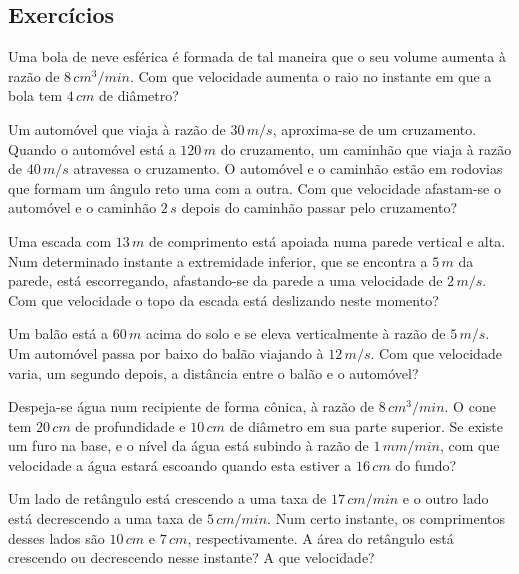 \cleardoublepage\documentclass[../main.tex]{subfiles}
\begin{document}
\subsection{Exercícios}
\begin{exer}
Uma bola de neve esférica é formada de tal maneira que o seu volume aumenta à razão de $8  \, cm^3/min$. Com que velocidade aumenta o raio no instante em que a bola tem $4   \, cm$ de diâmetro? 
\end{exer}
\begin{exer}
 Um automóvel que viaja à razão de $30   \, m/s$, aproxima-se de um cruzamento. Quando o automóvel está a $120\, m$ do cruzamento, um caminhão que viaja à razão de $40  \, m/s$ atravessa o cruzamento. O automóvel e o caminhão estão em rodovias que formam um ângulo reto uma com a outra. Com que velocidade afastam-se o automóvel e o caminhão $2\,s$ depois do caminhão passar pelo cruzamento? 
\end{exer}
\begin{exer}
 Uma escada com $13\, m$ de comprimento está apoiada numa parede vertical e alta. Num determinado instante a extremidade inferior, que se encontra a $5\, m$ da parede, está escorregando, afastando-se da parede a uma velocidade de $2   \, m/s$. Com que velocidade o topo da escada está deslizando neste momento? 
\end{exer}
\begin{exer}
Um balão está a $60\, m $ acima do solo e se eleva verticalmente à razão de $5   \, m/s$. Um automóvel  passa por baixo do balão viajando à $12   \, m/s$. Com que velocidade varia, um segundo depois, a distância entre o balão e o automóvel? 
\end{exer}
\begin{exer}
 Despeja-se água num recipiente de forma cônica, à razão de $8   \, cm^3/min$. O cone tem $20   \, cm $ de profundidade e $10   \, cm$ de diâmetro em sua parte superior. Se existe um furo na base, e o nível da água está subindo à razão de $1\, mm/min$, com que velocidade a água estará escoando quando esta estiver a $16   \, cm$ do fundo? 
\end{exer}
\begin{exer}
Um lado de retângulo está crescendo a uma taxa de $17   \, cm/min$ e o outro lado está decrescendo a uma taxa de $5   \, cm/min$. Num certo instante, os comprimentos desses lados são $10   \, cm $ e $ 7   \, cm$, respectivamente. A área do retângulo está crescendo ou decrescendo nesse instante? A que velocidade? 
\end{exer}
\end{document}
